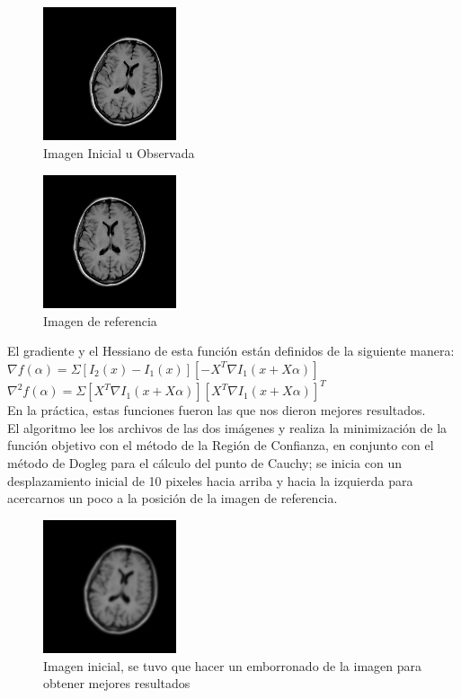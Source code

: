 \documentclass[10pt,journal,compsoc]{styles/IEEEtran}
\begin{document}
\begin{figure}[hbtp]
\centering
\includegraphics[width=0.35\textwidth]{mriC.png}
\caption{Imagen Inicial u Observada}
\end{figure}

\begin{figure}[hbtp]
\centering
\includegraphics[width=0.35\textwidth]{mriReferencia.png}
\caption{Imagen de referencia}
\end{figure}

El gradiente y el Hessiano de esta funci\'on est\'an definidos de la siguiente manera:\\

$\nabla f(\alpha)=\Sigma[I_2(x)-I_1(x)][-X^T \nabla I_1(x+X\alpha)]$\\
$\nabla^2 f(\alpha)=\Sigma[X^T \nabla I_1(x+X\alpha)][X^T \nabla I_1(x+X\alpha)]^T$\\

En la pr\'actica, estas funciones fueron las que nos dieron mejores resultados.\\

El algoritmo lee los archivos de las dos im\'agenes y realiza la minimizaci\'on de la funci\'on objetivo con el m\'etodo de la Regi\'on de Confianza, en conjunto con el m\'etodo de Dogleg para el c\'alculo del punto de Cauchy; se inicia con un desplazamiento inicial de 10 pixeles hacia arriba y hacia la izquierda para acercarnos un poco a la posici\'on de la imagen de referencia.

\begin{figure}[hbtp]
\centering
\includegraphics[width=0.35\textwidth]{mriCinicial.png}
\caption{Imagen inicial, se tuvo que hacer un emborronado de la imagen para obtener mejores resultados}
\end{figure}
\end{document}
